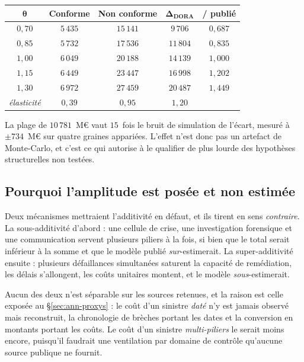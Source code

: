 \begin{center}\footnotesize
\renewcommand{\arraystretch}{1.25}
\begin{tabular}{@{}c c c c c@{}}
\toprule
$\boldsymbol{\theta}$ & \textbf{Conforme} & \textbf{Non conforme} &
$\boldsymbol{\Delta_{\text{DORA}}}$ & \textbf{/ publié} \\
\midrule
$0{,}70$ & $5\,435$ & $15\,141$ & $9\,706$ & $0{,}687$ \\
$0{,}85$ & $5\,732$ & $17\,536$ & $11\,804$ & $0{,}835$ \\
$1{,}00$ & $6\,049$ & $20\,188$ & $14\,139$ & $1{,}000$ \\
$1{,}15$ & $6\,449$ & $23\,447$ & $16\,998$ & $1{,}202$ \\
$1{,}30$ & $6\,972$ & $27\,459$ & $20\,487$ & $1{,}449$ \\
\midrule
\emph{élasticité} & $0{,}39$ & $0{,}95$ & $1{,}20$ & \\
\bottomrule
\end{tabular}
\end{center}

\vspace{4pt}
\noindent La plage de $10\,781$~M\euro{} vaut $15$~fois le bruit de simulation de l'écart, mesuré à
$\pm 734$~M\euro{} sur quatre graines appariées. L'effet n'est donc pas un artefact de Monte-Carlo,
et c'est ce qui autorise à le qualifier de plus lourde des hypothèses structurelles non testées.

\subsection*{Pourquoi l'amplitude est posée et non estimée}

Deux mécanismes mettraient l'additivité en défaut, et ils tirent en sens \emph{contraire}. La
sous-additivité d'abord : une cellule de crise, une investigation forensique et une communication
servent plusieurs piliers à la fois, si bien que le total serait inférieur à la somme et que le
modèle publié \emph{sur}-estimerait. La super-additivité ensuite : plusieurs défaillances
simultanées saturent la capacité de remédiation, les délais s'allongent, les coûts unitaires
montent, et le modèle \emph{sous}-estimerait.

Aucun des deux n'est séparable sur les sources retenues, et la raison est celle exposée au
\S\ref{sec:ann-proxys} : le coût d'un sinistre \emph{daté} n'y est jamais observé mais reconstruit,
la chronologie de brèches portant les dates et la conversion en montants portant les coûts. Le coût
d'un sinistre \emph{multi-piliers} le serait moins encore, puisqu'il faudrait une ventilation par
domaine de contrôle qu'aucune source publique ne fournit.


